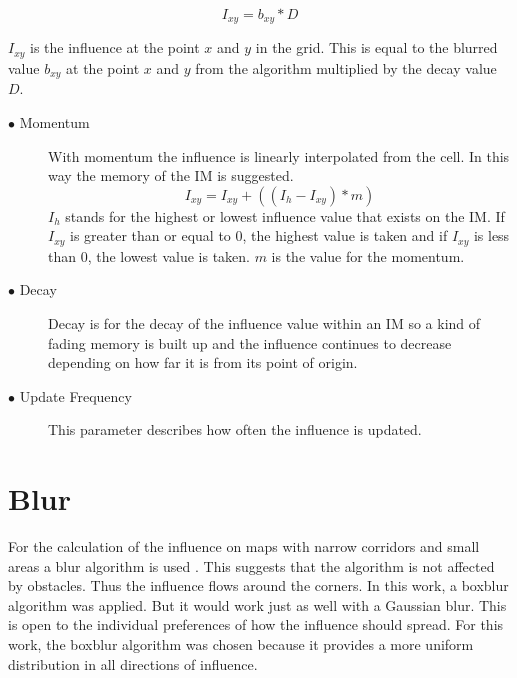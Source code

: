 \documentclass[]{report}
\begin{document}
	\begin{equation}
		I_{xy} = b_{xy} * D
	\end{equation}
	
	$I_{xy}$ is the influence at the point $x$ and $y$ in the grid. This is equal to the blurred value $b_{xy}$ at the point $x$ and $y$ from the algorithm multiplied by the decay value $D$.
	
	
	\begin{description}
		\item[$\bullet$ Momentum] With momentum the influence is linearly interpolated from the cell. In this way the memory of the IM is suggested.
		\begin{equation}
			I_{xy} = I_{xy} + ((I_{h} - I_{xy}) * m) 
		\end{equation}
		$I_{h}$ stands for the highest or lowest influence value that exists on the IM. If $I_{xy}$ is greater than or equal to $0$, the highest value is taken and if $I_{xy}$ is less than $0$, the lowest value is taken. $m$ is the value for the momentum. 
		
		\item[$\bullet$ Decay] Decay is for the decay of the influence value within an \ac{IM} so a kind of fading memory is built up and the influence continues to decrease depending on how far it is from its point of origin.
		\item[$\bullet$ Update Frequency] This parameter describes how often the influence is updated. 
		\end {description}
		
		\section{Blur } \label{ssec:num1}
		For the calculation of the influence on maps with narrow corridors and small areas a blur algorithm is used \citep{gameDevInfluenceMap}. \newline This suggests that the algorithm is not affected by obstacles. Thus the influence flows around the corners. In this work, a boxblur algorithm was applied. But it would work just as well with a Gaussian blur. This is open to the individual preferences of how the influence should spread. For this work, the boxblur algorithm was chosen because it provides a more uniform distribution in all directions of influence. 
		
\end{document}

